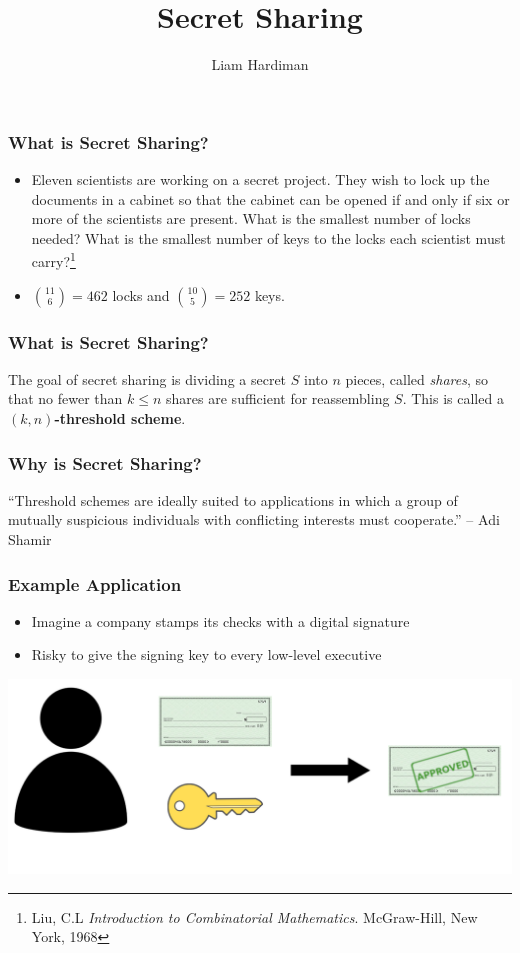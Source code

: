 \documentclass{beamer}
\title{Secret Sharing}
\author{Liam Hardiman}
\begin{document}
\maketitle

\begin{frame}
	\frametitle{What is Secret Sharing?}
	\begin{itemize}
		\item Eleven scientists are working on a secret project. They wish to lock up the documents in a cabinet so that the cabinet can be opened if and only if six or more of the scientists are present. What is the smallest number of locks needed? What is the smallest number of keys to the locks each scientist must carry?\footnote{Liu, C.L \textit{Introduction to Combinatorial Mathematics}. McGraw-Hill, New York, 1968}\\\pause

		\item $\binom{11}{6} = 462$ locks and $\binom{10}{5} = 252$ keys.
	\end{itemize}
\end{frame}

\begin{frame}
	\frametitle{What is Secret Sharing?}

	The goal of secret sharing is dividing a secret $S$ into $n$ pieces, called \textit{shares}, so that no fewer than $k\leq n$ shares are sufficient for reassembling $S$. This is called a $(k,n)$\textbf{-threshold scheme}.
\end{frame}

\begin{frame}
	\frametitle{Why is Secret Sharing?}
	``Threshold schemes are ideally suited to applications in which a group of mutually suspicious individuals with conflicting interests must cooperate.'' -- Adi Shamir
\end{frame}

\begin{frame}
	\frametitle{Example Application}
	\begin{itemize}
		\item Imagine a company stamps its checks with a digital signature\pause
		\item Risky to give the signing key to every low-level executive\pause
	\end{itemize}
	\vspace{1cm}
	\centering
	\includegraphics[scale=.6]{one_exec.png}
\end{frame}
\end{document}
